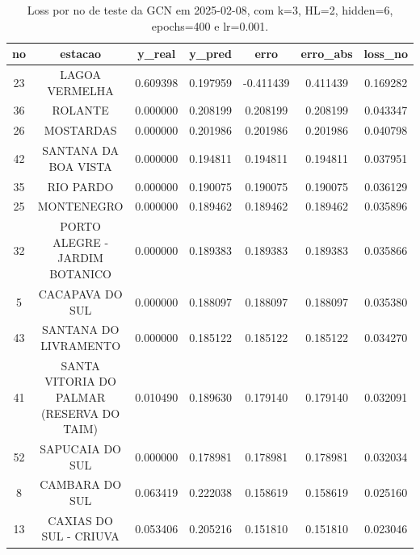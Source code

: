 \begin{table}[h]
\centering
\caption{Loss por no de teste da GCN em 2025-02-08, com k=3, HL=2, hidden=6, epochs=400 e lr=0.001.}
\label{tab:gcn_loss_k3_hl2_h6_e400_d20250208}
\begin{tabular}{ccccccc}
\toprule
no & estacao & y\_real & y\_pred & erro & erro\_abs & loss\_no \\
\midrule
23 & LAGOA VERMELHA & 0.609398 & 0.197959 & -0.411439 & 0.411439 & 0.169282 \\
36 & ROLANTE & 0.000000 & 0.208199 & 0.208199 & 0.208199 & 0.043347 \\
26 & MOSTARDAS & 0.000000 & 0.201986 & 0.201986 & 0.201986 & 0.040798 \\
42 & SANTANA DA BOA VISTA & 0.000000 & 0.194811 & 0.194811 & 0.194811 & 0.037951 \\
35 & RIO PARDO & 0.000000 & 0.190075 & 0.190075 & 0.190075 & 0.036129 \\
25 & MONTENEGRO & 0.000000 & 0.189462 & 0.189462 & 0.189462 & 0.035896 \\
32 & PORTO ALEGRE - JARDIM BOTANICO & 0.000000 & 0.189383 & 0.189383 & 0.189383 & 0.035866 \\
5 & CACAPAVA DO SUL & 0.000000 & 0.188097 & 0.188097 & 0.188097 & 0.035380 \\
43 & SANTANA DO LIVRAMENTO & 0.000000 & 0.185122 & 0.185122 & 0.185122 & 0.034270 \\
41 & SANTA VITORIA DO PALMAR (RESERVA DO TAIM) & 0.010490 & 0.189630 & 0.179140 & 0.179140 & 0.032091 \\
52 & SAPUCAIA DO SUL & 0.000000 & 0.178981 & 0.178981 & 0.178981 & 0.032034 \\
8 & CAMBARA DO SUL & 0.063419 & 0.222038 & 0.158619 & 0.158619 & 0.025160 \\
13 & CAXIAS DO SUL - CRIUVA & 0.053406 & 0.205216 & 0.151810 & 0.151810 & 0.023046 \\
\bottomrule
\end{tabular}
\end{table}
